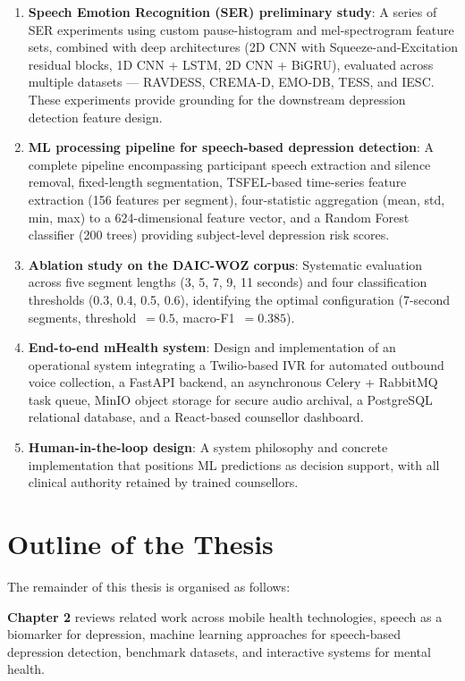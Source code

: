 \begin{enumerate}
    \item \textbf{Speech Emotion Recognition (SER) preliminary study}: A series of SER experiments using custom pause-histogram and mel-spectrogram feature sets, combined with deep architectures (2D CNN with Squeeze-and-Excitation residual blocks, 1D CNN + LSTM, 2D CNN + BiGRU), evaluated across multiple datasets — RAVDESS, CREMA-D, EMO-DB, TESS, and IESC. These experiments provide grounding for the downstream depression detection feature design.

    \item \textbf{ML processing pipeline for speech-based depression detection}: A complete pipeline encompassing participant speech extraction and silence removal, fixed-length segmentation, TSFEL-based time-series feature extraction (156 features per segment), four-statistic aggregation (mean, std, min, max) to a 624-dimensional feature vector, and a Random Forest classifier (200 trees) providing subject-level depression risk scores.

    \item \textbf{Ablation study on the DAIC-WOZ corpus}: Systematic evaluation across five segment lengths (3, 5, 7, 9, 11 seconds) and four classification thresholds (0.3, 0.4, 0.5, 0.6), identifying the optimal configuration (7-second segments, threshold~$= 0.5$, macro-F1~$= 0.385$).

    \item \textbf{End-to-end mHealth system}: Design and implementation of an operational system integrating a Twilio-based IVR for automated outbound voice collection, a FastAPI backend, an asynchronous Celery + RabbitMQ task queue, MinIO object storage for secure audio archival, a PostgreSQL relational database, and a React-based counsellor dashboard.

    \item \textbf{Human-in-the-loop design}: A system philosophy and concrete implementation that positions ML predictions as decision support, with all clinical authority retained by trained counsellors.
\end{enumerate}

\section{Outline of the Thesis}

The remainder of this thesis is organised as follows:

\noindent \textbf{Chapter 2} reviews related work across mobile health technologies, speech as a biomarker for depression, machine learning approaches for speech-based depression detection, benchmark datasets, and interactive systems for mental health.

